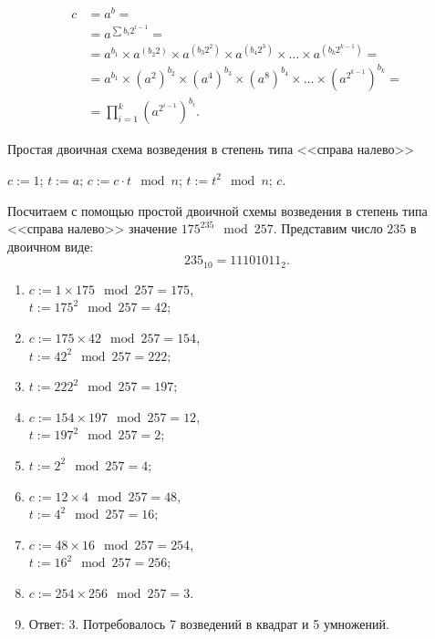 \[\begin{array}{ll}
c & = a^b = \\
  & = a^{\sum b_i 2^{i-1}} = \\
  & = a^{b_1} \times a^{(b_2 2)} \times a^{(b_3 2^2)} \times a^{(b_4 2^3)} \times \dots \times a^{(b_k 2^{k-1})} = \\
  & = a^{b_1} \times \left(a^2\right)^{b_2} \times \left(a^4\right)^{b_3} \times \left(a^8\right)^{b_4} \times \dots \times \left(a^{2^{k-1}}\right)^{b_k} = \\
  & = \prod\limits_{i=1}^{k} \left(a^{2^{i-1}}\right)^{b_i}.
\end{array}\]

\begin{algorithm}[ht]
	\caption{Простая двоичная схема возведения в степень типа <<справа налево>>\label{alg:power-mod-right-to-left}}
	\begin{algorithmic}
		\STATE $c := 1$;
		\STATE $t := a$;
				\STATE $c := c \cdot t \mod n$;
			\ENDIF
			\STATE $t := t^2 \mod n$;
		\ENDFOR
		\RETURN $c$.
	\end{algorithmic}
\end{algorithm}

\example Посчитаем с помощью простой двоичной схемы возведения в степень типа <<справа налево>> значение $175^{235} \mod 257$. Представим число $235$ в двоичном виде:
\[ 235_{10} = 11101011_{2}.\]
\begin{enumerate}
	\item $ c := 1 \times 175 \mod 257 = 175$, \\
		$ t:= 175^2 \mod 257 = 42$;
	\item $ c := 175 \times 42 \mod 257 = 154$, \\
		$ t:= 42^2 \mod 257 = 222$;
	\item $ t:= 222^2 \mod 257 = 197$;
	\item $ c := 154 \times 197 \mod 257 = 12$, \\
		$ t:= 197^2 \mod 257 = 2$;
	\item $ t:= 2^2 \mod 257 = 4$;
	\item $ c := 12 \times 4 \mod 257 = 48$, \\
		$ t:= 4^2 \mod 257 = 16$;
	\item $ c := 48 \times 16 \mod 257 = 254$, \\
		$ t:= 16^2 \mod 257 = 256$;
	\item $ c := 254 \times 256 \mod 257 = 3$.
	\item Ответ: 3. Потребовалось 7 возведений в квадрат и 5 умножений.
\end{enumerate}
\exampleend




